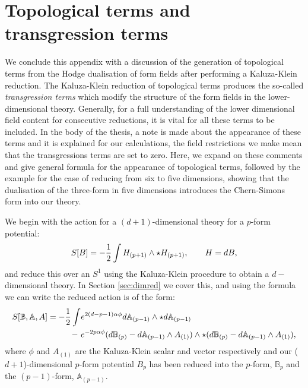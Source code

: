 \section{Topological terms and transgression terms}

We conclude this appendix with a discussion of the generation of topological terms from the Hodge dualisation of form fields after performing a Kaluza-Klein reduction. The Kaluza-Klein reduction of topological terms produces the so-called \emph{transgression terms} which modify the structure of the form fields in the lower-dimensional theory. Generally, for a full understanding of the lower dimensional field content for consecutive reductions, it is vital for all these terms to be included. In the body of the thesis, a note is made about the appearance of these terms and it is explained for our calculations, the field restrictions we make mean that the transgressions terms are set to zero. Here, we expand on these comments and give general formula for the appearance of topological terms, followed by the example for the case of reducing from six to five dimensions, showing that the dualisation of the three-form in five dimensions introduces the Chern-Simons form into our theory.

We begin with the action for a $(d+1)$-dimensional theory for a $p$-form potential:
\begin{equation*}
	S[B] = - \frac{1}{2} \int {H}_{(p+1)} \wedge  \star {H}_{(p+1)} ,\qquad {H} = d{B},
\end{equation*}
and reduce this over an $S^1$ using the Kaluza-Klein procedure to obtain a $d-$dimensional theory. In Section \ref{sec:dimred} we cover this, and using the formula  we can write the reduced action is of the form:
\begin{equation}
\label{eq:redactswap}
\begin{aligned}
		S[\mathbb{B},\mathbb{A},A] = - \frac{1}{2} \int &e^{2(d - p-1)\alpha \phi}  d \mathbb{A}_{(p-1)} \wedge \star d \mathbb{A}_{(p-1)} \\ - \ &e^{-2p\alpha \phi}  (d \mathbb{B}_{(p)} - d \mathbb{A}_{(p-1)} \wedge A_{(1)})\wedge \star (d \mathbb{B}_{(p)} - d \mathbb{A}_{(p-1)} \wedge A_{(1)}),
\end{aligned}
\end{equation}
where $\phi$ and $A_{(1)}$ are the Kaluza-Klein scalar and vector respectively and our ($d+1$)-dimensional $p$-form potential $B_{p}$ has been reduced into the $p$-form, $\mathbb{B}_{p}$ and the $(p-1)$-form, $ \mathbb{A}_{(p-1)}$.

